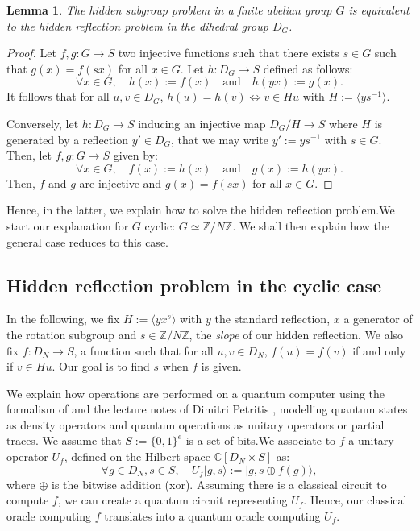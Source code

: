 \documentclass[a4paper,10pt,notitlepage]{report}
\theoremstyle{definition}
\theoremstyle{plain}
\newtheorem{Lemma}[Definition]{Lemma}
\theoremstyle{definition}
\newcommand{\Z}{\mathbb{Z}}
\newcommand{\C}{\mathbb{C}}
\renewcommand{\(}{\left(}
\renewcommand{\)}{\right)}
\begin{document}
\begin{Lemma}
The hidden subgroup problem in a finite abelian group $G$ is equivalent to the hidden reflection problem in the dihedral group $D_G$.
\end{Lemma}

\begin{proof}
Let $f,g: G\longrightarrow S$ two injective functions such that there exists $s\in G$ such that $g(x)=f(sx)$ for all $x\in G$.  Let $h: D_G\longrightarrow S$ defined as follows:
\[\forall x\in G, \quad h(x):=f(x) \quad \mbox{and} \quad h(yx):=g(x).\]
It follows that for all $u,v\in D_G$, $h(u)=h(v)\Longleftrightarrow v\in Hu$ with $H:=\langle ys^{-1}\rangle$.

Conversely, let $h: D_G\longrightarrow S$ inducing an injective map $D_G/H\longrightarrow S$ where $H$ is generated by a reflection $y'\in D_G$, that we may write $y':=ys^{-1}$ with $s\in G$. Then, let $f, g:G\longrightarrow S$ given by:
\[\forall x\in G, \quad f(x):=h(x) \quad \mbox{and} \quad g(x):=h(yx).\]
Then, $f$ and $g$ are injective and $g(x)=f(sx)$ for all $x\in G$.
\end{proof}

Hence, in the latter, we explain how to solve the hidden reflection problem.We start our explanation for $G$ cyclic: $G\simeq\Z/N\Z$. We shall then explain how the general case reduces to this case. 

\subsection{Hidden reflection problem in the cyclic case}

In the following, we fix $H:=\langle yx^s\rangle$ with $y$ the standard reflection, $x$ a generator of the rotation subgroup and $s\in\Z/N\Z$, the \emph{slope} of our hidden reflection.  We also fix $f:D_N\longrightarrow S$, a function such that for all $u, v\in D_N$, $f(u)=f(v)$ if and only if $v\in Hu$. Our goal is to find $s$ when $f$ is given.

We explain how operations are performed on a quantum computer using the formalism of \cite[chapter 8]{NielsanChaung} and the lecture notes of Dimitri Petritis \cite[chapters 2 and 3]{Petritis}, modelling quantum states as density operators and quantum operations as unitary operators or partial traces. We assume that $S:=\{0,1\}^e$ is a set of bits.We associate to $f$ a unitary operator $U_f$, defined on the Hilbert space $\C[D_N\times S]$ as:
\[\forall g\in D_N, s\in S, \quad U_f|g,s\rangle:=|g,s\oplus f(g)\rangle,\]
where $\oplus$ is the bitwise addition (xor). Assuming there is a classical circuit to compute $f$, we can create a quantum circuit representing $U_f$. Hence, our classical oracle computing $f$ translates into a quantum oracle computing $U_f$. 
\end{document}
